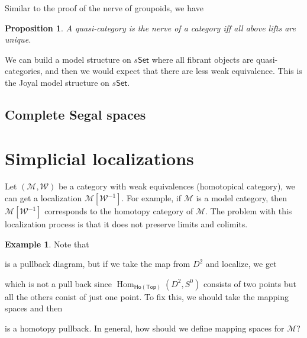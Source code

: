 \documentclass[11pt]{amsart}
\numberwithin{equation}{section}
\newtheorem{prop}[thm]{Proposition}
\theoremstyle{definition}
\newtheorem{example}[thm]{Example}
\theoremstyle{remark}
\numberwithin{equation}{section}
\newcommand{\CW}{{\mathcal{W}}}
\newcommand{\cm}{{\mathcal{M}}}
\newcommand{\ho}{\mathsf{Ho}}
\newcommand{\set}{\mathsf{Set}}
\newcommand{\Top}{\mathsf{Top}}
\newcommand{\Hom}{\operatorname{Hom}}
\newcommand{\map}{\operatorname{Map}}
\begin{document}
Similar to the proof of the nerve of groupoids, we have
\begin{prop}
A quasi-category is the nerve of a category iff all above lifts are unique.
\end{prop}
We can build a model structure on $s\set$ where all fibrant objects are quasi-categories, and then we would expect that there are less weak equivalence. This is the Joyal model structure on $s\set$.



\subsection{Complete Segal spaces}
\section{Simplicial localizations}
Let $(\cm,\CW)$ be a category with weak equivalences (homotopical category), we can get a localization $\cm[\CW^{-1}]$. For example, if $\cm$ is a model category, then $\cm[\CW^{-1}]$ corresponds to the homotopy category of $\cm$. The problem with this localization process is that it does not preserve limits and colimits.

\begin{example}
	Note that
	\begin{center}
	\end{center}
\end{example}
is a pullback diagram, but if we take the map from $D^2$ and localize, we get
\begin{center}
\end{center}
which is not a pull back since  $\Hom_{\ho(\Top)}(D^2, S^0)$ consists of two points but all the others conist of just one point. To fix this, we should take the mapping spaces and then

\begin{center}
\end{center}
is a homotopy pullback. In general, how should we define mapping spaces for $\cm$?
\end{document}

